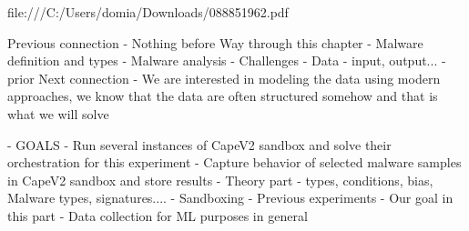 file:///C:/Users/domia/Downloads/088851962.pdf



Previous connection
- Nothing before
Way through this chapter
- Malware definition and types
- Malware analysis
- Challenges
- Data - input, output...
- prior
Next connection
- We are interested in modeling the data using modern approaches, we know that the data are often structured somehow and that is what we will solve

- GOALS
  - Run several instances of CapeV2 sandbox and solve their orchestration for this experiment
  - Capture behavior of selected malware samples in CapeV2 sandbox and store results
- Theory part - types, conditions, bias, Malware types, signatures....
- Sandboxing
- Previous experiments
- Our goal in this part
- Data collection for ML purposes in general